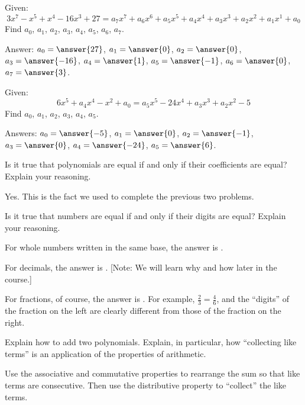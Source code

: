\documentclass[nooutcomes]{ximera}
\begin{document}
\begin{problem}Given:
\[
3x^7 -x^5 + x^4 -16x^3 + 27 = a_7 x^7 + a_6x^6 + a_5x^5 + a_4x^4 + a_3x^3 + a_2x^2 + a_1x^1 + a_0
\]
Find $a_0$, $a_1$, $a_2$, $a_3$, $a_4$, $a_5$, $a_6$, $a_7$.

Answer: $a_0=\answer{27}$, $a_1=\answer{0}$, $a_2=\answer{0}$, $a_3=\answer{-16}$, $a_4=\answer{1}$, $a_5=\answer{-1}$, $a_6=\answer{0}$, $a_7=\answer{3}$.
\end{problem} 

\begin{problem}Given:
\[
6x^5+a_4 x^4 -x^2 + a_0 = a_5 x^5 - 24 x^4 + a_3 x^3 + a_2 x^2 - 5
\]
Find $a_0$, $a_1$, $a_2$, $a_3$, $a_4$, $a_5$.

Answers: $a_0=\answer{-5}$, $a_1=\answer{0}$, $a_2=\answer{-1}$, $a_3=\answer{0}$, $a_4=\answer{-24}$, $a_5=\answer{6}$.
\end{problem} 

\begin{problem}Is it true that polynomials are equal if and only if their
  coefficients are equal? Explain your reasoning.
\begin{freeResponse}
\begin{hint}
Yes.  This is the fact we used to complete the previous two problems.
\end{hint}
\end{freeResponse}
\end{problem} 

\begin{problem}Is it true that numbers are equal if and only if their digits
  are equal? Explain your reasoning.
\begin{freeResponse}
\begin{hint}
For whole numbers written in the same base, the answer is .  

For decimals, the answer is .  [Note: We will learn why and how later in the course.] 

For fractions, of course, the answer is .  For example, $\frac{2}{3}=\frac{4}{6}$, and the ``digits'' of the fraction on the left are clearly different from those of the fraction on the right. 
\end{hint}
\end{freeResponse}
\end{problem} 

\begin{problem}Explain how to add two polynomials.  Explain, in particular, how ``collecting like terms'' is
an application of the properties of arithmetic.  
\begin{freeResponse}
\begin{hint}
Use the associative and commutative properties to rearrange the sum so that like terms are consecutive.  Then use the distributive property to ``collect'' the like terms. 
\end{hint}
\end{freeResponse}
\end{problem} 
\end{document}
